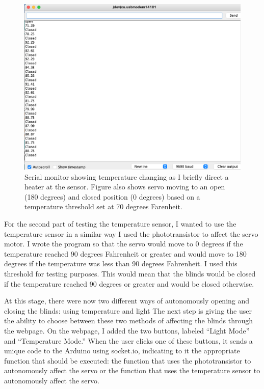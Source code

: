 \documentclass[10pt,twocolumn]{article}
\begin{document}
\begin{figure}
    \centering
    \includegraphics[width=.95\linewidth]{Figure 5.png}
    \caption{
        Serial monitor showing temperature changing as I briefly direct a heater at the sensor. Figure also shows servo moving to an open (180 degrees) and closed position (0 degrees) based on a temperature threshold set at 70 degrees Farenheit.
    }
    \label{fig:fig5}
\end{figure}

For the second part of testing the temperature sensor, I wanted to use the temperature sensor in a similar way I used the phototransistor to affect the servo motor. I wrote the program so that the servo would move to 0 degrees if the temperature reached 90 degrees Fahrenheit or greater and would move to 180 degrees if the temperature was less than 90 degrees Fahrenheit. I used this threshold for testing purposes. This would mean that the blinds would be closed if the temperature reached 90 degrees or greater and would be closed otherwise.

At this stage, there were now two different ways of autonomously opening and closing the blinds: using temperature and light The next step is giving the user the ability to choose between these two methods of affecting the blinds through the webpage. On the webpage, I added the two buttons, labeled “Light Mode'' and “Temperature Mode.” When the user clicks one of these buttons, it sends a unique code to the Arduino using socket.io, indicating to it the appropriate function that should be executed: the function that uses the phototransistor to autonomously affect the servo or the function that uses the temperature sensor to autonomously affect the servo. 
\end{document}
